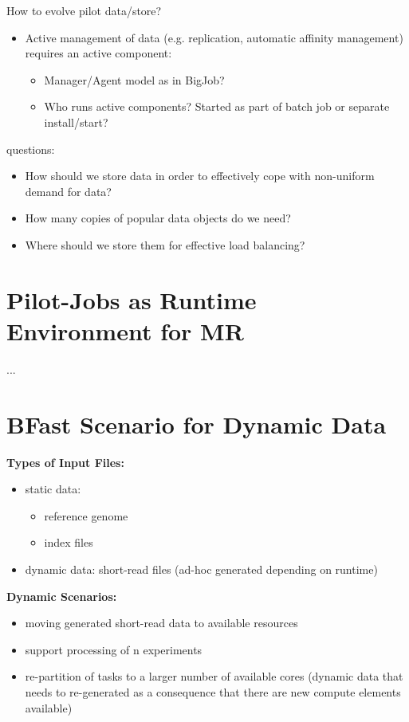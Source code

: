 \documentclass[]{article}
\begin{document}
How to evolve pilot data/store?
\begin{itemize}
	\item Active management of data (e.g. replication, automatic affinity management) requires an active component:
	\begin{itemize}
		\item Manager/Agent model as in BigJob?
		\item Who runs active components? Started as part of batch job or separate install/start?
	\end{itemize}
\end{itemize}

questions:
\begin{itemize}
    \item How should
    we store data in order to effectively cope with non-uniform demand for
    data? 
    \item How many copies of popular data objects do we need? 
    \item Where should we store them for effective load balancing?
\end{itemize}

\section{Pilot-Jobs as Runtime Environment for MR}
...


\section{BFast Scenario for Dynamic Data}

\textbf{Types of Input Files:}
\begin{itemize}
	\item static data: 
	\begin{itemize}
		\item reference genome
		\item index files
	\end{itemize}
	\item dynamic data: short-read files (ad-hoc generated depending on runtime)
\end{itemize}

\noindent
\textbf{Dynamic Scenarios:}
\begin{itemize}
	\item moving generated short-read data to available resources
	
	\item support processing of n experiments 

	\item re-partition of tasks to a larger number of available cores (dynamic data that needs to re-generated as a consequence that there are new compute elements available)

\end{itemize}



\end{document}
